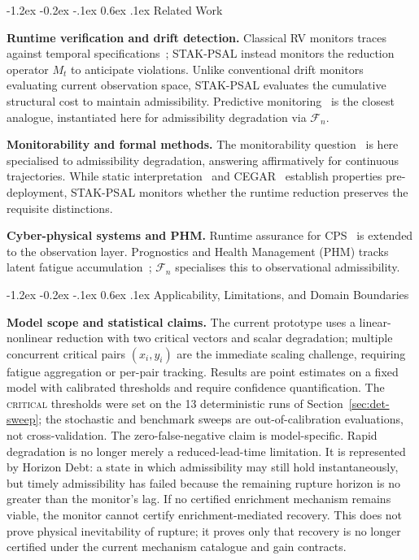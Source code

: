 \documentclass{llncs}
\makeatletter
\renewcommand\section{\@startsection{section}{1}{\z@}%
  {-1.2ex \@plus -0.2ex \@minus -.1ex}%
  {0.6ex \@plus .1ex}%
  {\normalfont\large\bfseries}}
\newcommand{\st}[1]{\textup{\textsc{#1}}}
\makeatother
\begin{document}
\section{Related Work}
\label{sec:related}

\textbf{Runtime verification and drift detection.}
Classical RV monitors traces against temporal specifications~\cite{leucker2009brief,havelund2018rule}; STAK-PSAL instead monitors the reduction operator $M_t$ to anticipate violations. Unlike conventional drift monitors evaluating current observation space, STAK-PSAL evaluates the cumulative structural cost to maintain admissibility. Predictive monitoring~\cite{zhao2021predictive,chen2009monitoring} is the closest analogue, instantiated here for admissibility degradation via $\mathcal{F}_n$.

\textbf{Monitorability and formal methods.}
The monitorability question~\cite{francalanza2017theory,bauer2011runtime} is here specialised to admissibility degradation, answering affirmatively for continuous trajectories. While static interpretation~\cite{cousot1977abstract} and CEGAR~\cite{clarke2000counterexample} establish properties pre-deployment, STAK-PSAL monitors whether the runtime reduction preserves the requisite distinctions.

\textbf{Cyber-physical systems and PHM.}
Runtime assurance for CPS~\cite{seshia2015towards,schierman2015runtime} is extended to the observation layer. Prognostics and Health Management (PHM) tracks latent fatigue accumulation~\cite{jardine2006review,chiang2014fault}; $\mathcal{F}_n$ specialises this to observational admissibility.

\section{Applicability, Limitations, and Domain Boundaries}
\label{sec:limits}

\textbf{Model scope and statistical claims.} The current prototype uses
a linear-nonlinear reduction with two critical vectors and scalar
degradation; multiple concurrent critical pairs $(x_i, y_i)$ are the
immediate scaling challenge, requiring fatigue aggregation or per-pair
tracking. Results are point estimates on a fixed model with calibrated
thresholds and require confidence quantification. The \st{critical}
thresholds were set on the 13 deterministic runs of
Section~\ref{sec:det-sweep}; the stochastic and benchmark sweeps are
out-of-calibration evaluations, not cross-validation. The
zero-false-negative claim is model-specific. Rapid degradation is no longer merely a reduced-lead-time limitation. It is represented by Horizon Debt: a state in which admissibility may still hold instantaneously, but timely admissibility has failed because the remaining rupture horizon is no greater than the monitor's lag. If no certified enrichment mechanism remains viable, the monitor cannot certify enrichment-mediated recovery. This does not prove physical inevitability of rupture; it proves only that recovery is no longer certified under the current mechanism catalogue and gain contracts.
\end{document}
